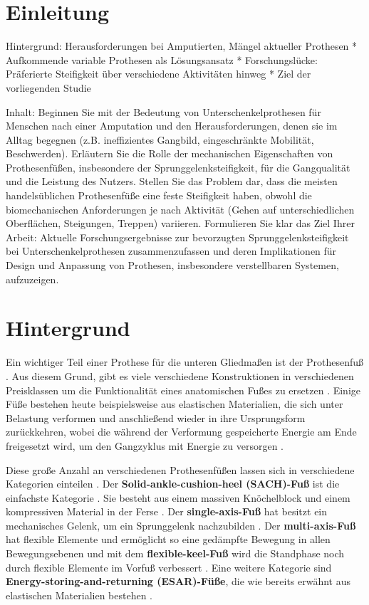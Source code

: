 \section{Einleitung}
Hintergrund: Herausforderungen bei Amputierten, Mängel aktueller Prothesen *   Aufkommende variable Prothesen als Lösungsansatz *   Forschungslücke: Präferierte Steifigkeit über verschiedene Aktivitäten hinweg *   Ziel der vorliegenden Studie

Inhalt: Beginnen Sie mit der Bedeutung von Unterschenkelprothesen für Menschen nach einer Amputation und den Herausforderungen, denen sie im Alltag begegnen (z.B. ineffizientes Gangbild, eingeschränkte Mobilität, Beschwerden). Erläutern Sie die Rolle der mechanischen Eigenschaften von Prothesenfüßen, insbesondere der Sprunggelenksteifigkeit, für die Gangqualität und die Leistung des Nutzers. Stellen Sie das Problem dar, dass die meisten handelsüblichen Prothesenfüße eine feste Steifigkeit haben, obwohl die biomechanischen Anforderungen je nach Aktivität (Gehen auf unterschiedlichen Oberflächen, Steigungen, Treppen) variieren. Formulieren Sie klar das Ziel Ihrer Arbeit: Aktuelle Forschungsergebnisse zur bevorzugten Sprunggelenksteifigkeit bei Unterschenkelprothesen zusammenzufassen und deren Implikationen für Design und Anpassung von Prothesen, insbesondere verstellbaren Systemen, aufzuzeigen.

\section{Hintergrund}  %
Ein wichtiger Teil einer Prothese für die unteren Gliedmaßen ist der Prothesenfuß \cite{Stevens.2018}. Aus diesem Grund, gibt es viele verschiedene Konstruktionen in verschiedenen Preisklassen um die Funktionalität eines anatomischen Fußes zu ersetzen \cite{Stevens.2018}. Einige Füße bestehen heute beispielsweise aus elastischen Materialien, die sich unter Belastung verformen und anschließend wieder in ihre Ursprungsform zurückkehren, wobei die während der Verformung gespeicherte Energie am Ende freigesetzt wird, um den Gangzyklus mit Energie zu versorgen \cite{Stevens.2018}. 

Diese große Anzahl an verschiedenen Prothesenfüßen lassen sich in verschiedene Kategorien einteilen \cite{Stevens.2018}. Der \textbf{Solid-ankle-cushion-heel (SACH)-Fuß} ist die einfachste Kategorie \cite{Stevens.2018}. Sie besteht aus einem massiven Knöchelblock und einem kompressiven Material in der Ferse \cite{Stevens.2018}. Der \textbf{single-axis-Fuß} hat besitzt ein mechanisches Gelenk, um ein Sprunggelenk nachzubilden \cite{Stevens.2018}. Der \textbf{multi-axis-Fuß} hat flexible Elemente und ermöglicht so eine gedämpfte Bewegung in allen Bewegungsebenen und mit dem \textbf{flexible-keel-Fuß} wird die Standphase noch durch flexible Elemente im Vorfuß verbessert \cite{Stevens.2018}. Eine weitere Kategorie sind \textbf{Energy-storing-and-returning (ESAR)-Füße}, die wie bereits erwähnt aus elastischen Materialien bestehen \cite{Stevens.2018}.  \\


